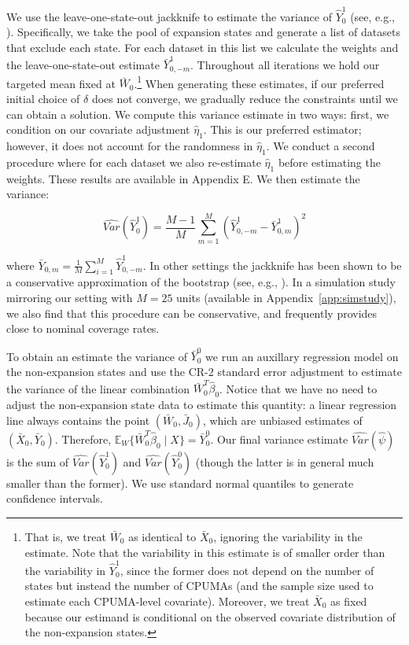 \documentclass[aoas]{imsart}
\theoremstyle{plain}
\theoremstyle{remark}
\begin{document}
We use the leave-one-state-out jackknife to estimate the variance of $\hat{Y}_0^1$ (see, e.g., \cite{cameron2015practitioner}). Specifically, we take the pool of expansion states and generate a list of datasets that exclude each state. For each dataset in this list we calculate the weights and the leave-one-state-out estimate $\bar{Y}^1_{0, -m}$. Throughout all iterations we hold our targeted mean fixed at $\bar{W}_0$.\footnote{That is, we treat $\bar{W}_0$ as identical to $\bar{X}_0$, ignoring the variability in the estimate. Note that the variability in this estimate is of smaller order than the variability in $\hat{Y}_0^1$, since the former does not depend on the number of states but instead the number of CPUMAs (and the sample size used to estimate each CPUMA-level covariate). Moreover, we treat $\bar{X}_0$ as fixed because our estimand is conditional on the observed covariate distribution of the non-expansion states.} When generating these estimates, if our preferred initial choice of $\delta$ does not converge, we gradually reduce the constraints until we can obtain a solution. We compute this variance estimate in two ways: first, we condition on our covariate adjustment $\hat{\eta}_1$. This is our preferred estimator; however, it does not account for the randomness in $\hat{\eta}_1$. We conduct a second procedure where for each dataset we also re-estimate $\hat{\eta}_1$ before estimating the weights. These results are available in Appendix E. We then estimate the variance:

\begin{equation}
    \hat{Var}(\hat{Y}_0^1) = \frac{M - 1}{M}\sum_{m = 1}^M(\hat{Y}^1_{0,-m} - \bar{Y}^1_{0, m})^2
\end{equation}

where $\bar{Y}_{0, m} = \frac{1}{M}\sum_{i=1}^M\hat{Y}^1_{0, -m}$. In other settings the jackknife has been shown to be a conservative approximation of the bootstrap (see, e.g., \cite{efron1981jackknife}). In a simulation study mirroring our setting with $M = 25$ units (available in Appendix~\ref{app:simstudy}), we also find that this procedure can be conservative, and frequently provides close to nominal coverage rates.

To obtain an estimate the variance of $\bar{Y}_0^0$ we run an auxillary regression model on the non-expansion states and use the CR-2 standard error adjustment to estimate the variance of the linear combination $\bar{W}_0^T\hat{\beta}_0$. Notice that we have no need to adjust the non-expansion state data to estimate this quantity: a linear regression line always contains the point $(\bar{W}_0, \bar{J}_0)$, which are unbiased estimates of $(\bar{X}_0, \bar{Y}_0)$. Therefore, $\mathbb{E}_W\{\bar{W}_0^T\hat{\beta}_0 \mid X\} = \bar{Y}_0^0$. Our final variance estimate $\hat{Var}(\hat{\psi})$ is the sum of $\hat{Var}(\hat{Y}_0^1)$ and $\hat{Var}(\hat{Y}_0^0)$ (though the latter is in general much smaller than the former). We use standard normal quantiles to generate confidence intervals. 
\end{document}
